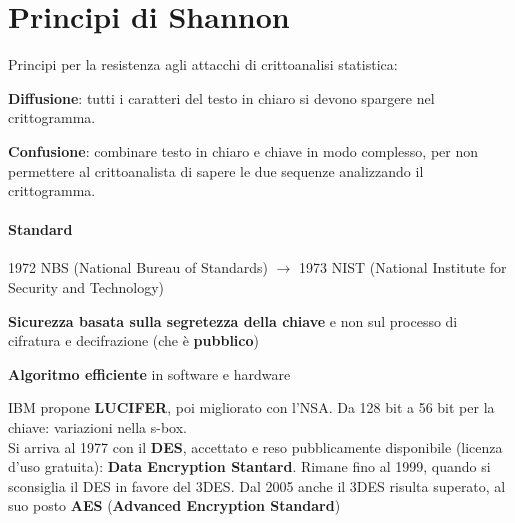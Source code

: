 \documentclass[10pt]{book}
\begin{document}
\section{Principi di Shannon}
Principi per la resistenza agli attacchi di crittoanalisi statistica:
\begin{list}{}{}
	\item \textbf{Diffusione}: tutti i caratteri del testo in chiaro si devono spargere nel crittogramma.
	\item \textbf{Confusione}: combinare testo in chiaro e chiave in modo complesso, per non permettere al crittoanalista di sapere le due sequenze analizzando il crittogramma.
\end{list}
\paragraph{Standard} 1972 NBS (National Bureau of Standards) $\rightarrow$ 1973 NIST (National Institute for Security and Technology)
\begin{list}{}{}
	\item \textbf{Sicurezza basata sulla segretezza della chiave} e non sul processo di cifratura e decifrazione (che è \textbf{pubblico})
	\item \textbf{Algoritmo efficiente} in software e hardware
\end{list}
IBM propone \textbf{LUCIFER}, poi migliorato con l'NSA. Da 128 bit a 56 bit per la chiave: variazioni nella s-box.\\
Si arriva al 1977 con il \textbf{DES}, accettato e reso pubblicamente disponibile (licenza d'uso gratuita): \textbf{Data Encryption Stantard}. Rimane fino al 1999, quando si sconsiglia il DES in favore del 3DES. Dal 2005 anche il 3DES risulta superato, al suo posto \textbf{AES} (\textbf{Advanced Encryption Standard})
\end{document}
